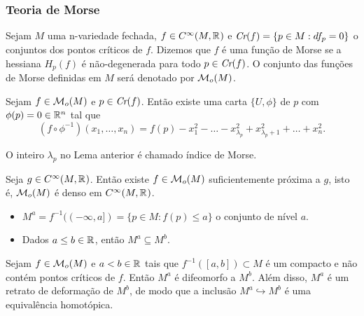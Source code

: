 \documentclass{beamer}
\begin{document}
	\begin{frame}
		\frametitle{Teoria de Morse}
		\begin{definicao}
			Sejam $M$ uma n-variedade fechada, $f \in C^{\infty}(M, \mathbb{R}^{})$ e $\textit{Cr}(f) = \{p \in M: df_{p} = 0\}$ o conjuntos dos pontos críticos de $f$. Dizemos que $f$ é uma função de Morse se a hessiana $H_{p}(f)$ é não-degenerada para todo $p \in \textit{Cr}(f)$. O conjunto das funções de Morse definidas em $M$ será denotado por $\mathcal{M}_{o}(M)$. 
		\end{definicao}
		\begin{lema}
			Sejam $f \in \mathcal{M}_{o}(M)$ e $p \in \textit{Cr}(f)$. Então existe uma carta $\{U, \phi\}$ de $p$ com $\phi(p)=0 \in \mathbb{R}^{n}$ tal que 
			$$
			(f\circ \phi^{-1})(x_{1}, \dots, x_{n}) = f(p)-x_{1}^{2}-\dots -x^{2}_{\lambda_{p}}+x^{2}_{\lambda_{p}+1}+\dots + x^{2}_{n}.
			$$
		\end{lema}
	\end{frame}
	
	\begin{frame}
		
		\begin{definicao}
			O inteiro $\lambda_{p}$ no Lema anterior é chamado índice de Morse.
		\end{definicao}
		
		\pause
		\begin{teorema}
			Seja $g\in C^{\infty}(M, \mathbb{R}^{})$. Então existe $f \in \mathcal{M}_{o}(M)$ suficientemente próxima a $g$, isto é, $\mathcal{M}_{o}(M)$ é denso em $C^{\infty}(M, \mathbb{R}^{})$.
		\end{teorema}
	\end{frame}
	
	\begin{frame}
			\begin{itemize}
				\item $M^{a}= f^{-1}((-\infty, a]) = \{p \in M: f(p)\leq a\}$ o conjunto de nível $a$. 
				
				\item Dados $a\leq b \in \mathbb{R}^{}$, então $M^{a} \subseteq M^{b}$.
			\end{itemize}
			
			\pause
			\begin{teorema}
				Sejam $f \in \mathcal{M}_{o}(M)$ e $a<b \in \mathbb{R}^{}$ tais que $f^{-1}([a,b])\subset M$ é um compacto e não contém pontos críticos de $f$. Então $M^{a}$ é difeomorfo a $M^{b}$. Além disso, $M^{a}$ é um retrato de deformação de $M^{b}$, de modo que a inclusão  $M^{a} \hookrightarrow M^{b}$ é uma equivalência homotópica.
			\end{teorema}
			
	\end{frame}
	
\end{document}
